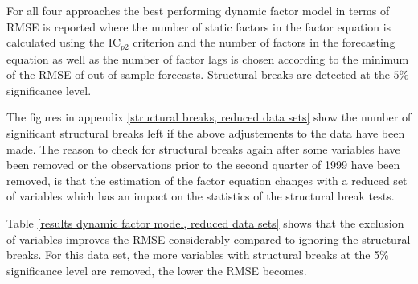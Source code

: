 \documentclass[12pt]{article}
\begin{document}
For all four approaches the best performing dynamic factor model in terms of RMSE is reported where the number of static factors in the factor equation is calculated using the IC$_{p2}$ criterion and the number of factors in the forecasting equation as well as the number of factor lags is chosen according to the minimum of the RMSE of out-of-sample forecasts. Structural breaks are detected at the $5\%$ significance level.

The figures in appendix \ref{structural breaks, reduced data sets} show the number of significant structural breaks left if the above adjustements to the data have been made. The reason to check for structural breaks again after some variables have been removed or the observations prior to the second quarter of 1999 have been removed, is that the estimation of the factor equation changes with a reduced set of variables which has an impact on the statistics of the structural break tests.

Table \ref{results dynamic factor model, reduced data sets} shows that the exclusion of variables improves the RMSE considerably compared to ignoring the structural breaks. For this data set, the more variables with structural breaks at the 5\% significance level are removed, the lower the RMSE becomes.
\end{document}
